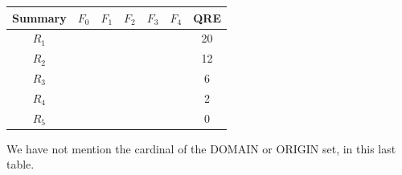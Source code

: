 		\begin{table}[h!]
			\begin{center}
				\begin{tabular}{|c|c|c|c|c|c|c|}
				\hline
					\cellcolor{lightgray!50} Summary  &
					\cellcolor{lightgray} $F_{0}$     &
					\cellcolor{lightgray} $F_{1}$     &
					\cellcolor{lightgray} $F_{2}$     &
					\cellcolor{lightgray} $F_{3}$     &
					\cellcolor{lightgray} $F_{4}$     &
					\cellcolor{lightgray!50} QRE      \\
				\hline
					\cellcolor{lightgray} $R_{1}$     &
					\cellcolor{applegreen!50} $\:\:$  &
					\cellcolor{bosunired!50}  $\:\:$  &
					\cellcolor{bosunired!50}  $\:\:$  &
					\cellcolor{bosunired!50}  $\:\:$  &
					\cellcolor{bosunired!50}  $\:\:$  &
					20 \\
				\hline
					\cellcolor{lightgray} $R_{2}$     &
					\cellcolor{applegreen!50} $\:\:$  &
					\cellcolor{applegreen!50} $\:\:$  &
					\cellcolor{bosunired!50}  $\:\:$  &
					\cellcolor{bosunired!50}  $\:\:$  &
					\cellcolor{bosunired!50}  $\:\:$  &
					12 \\
				\hline
					\cellcolor{lightgray} $R_{3}$     &
					\cellcolor{applegreen!50} $\:\:$  &
					\cellcolor{applegreen!50} $\:\:$  &
					\cellcolor{applegreen!50} $\:\:$  &
					\cellcolor{bosunired!50}  $\:\:$  &
					\cellcolor{bosunired!50}  $\:\:$  &
					6 \\
				\hline
					\cellcolor{lightgray} $R_{4}$     &
					\cellcolor{applegreen!50} $\:\:$  &
					\cellcolor{applegreen!50} $\:\:$  &
					\cellcolor{applegreen!50} $\:\:$  &
					\cellcolor{applegreen!50}  $\:\:$  &
					\cellcolor{bosunired!50}  $\:\:$  &
					2 \\
				\hline
					\cellcolor{lightgray} $R_{5}$     &
					\cellcolor{applegreen!50} $\:\:$  &
					\cellcolor{applegreen!50} $\:\:$  &
					\cellcolor{applegreen!50} $\:\:$  &
					\cellcolor{applegreen!50}  $\:\:$  &
					\cellcolor{applegreen!50}  $\:\:$  &
					0 \\
				\hline
				\end{tabular}
			\end{center}
		\end{table}
		
		\noindent
		We have not mention the cardinal of the DOMAIN or ORIGIN set, in this last table.
		\\\\
		
